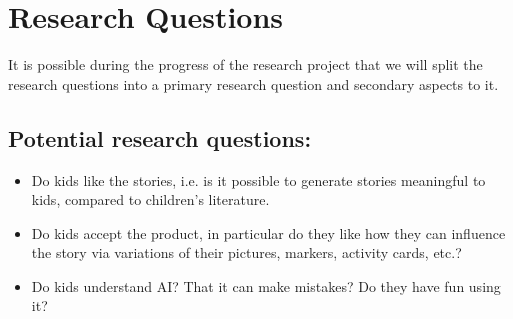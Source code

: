 \section{Research Questions}
It is possible during the progress of the research project that we will split the research questions into a primary research question and secondary aspects to it.

\subsection*{Potential research questions:}
\begin{itemize}
    \item Do kids like the stories, i.e. is it possible to generate stories meaningful to kids, compared to children’s literature.
    \item Do kids accept the product, in particular do they like how they can influence the story via variations of their pictures, markers, activity cards, etc.?
    \item Do kids understand AI? That it can make mistakes? Do they have fun using it?
  \end{itemize}  